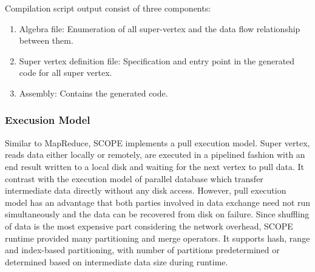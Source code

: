 \documentclass[runningheads,a4paper]{llncs}
\begin{document}
{Compilation script output consist of three components:
\begin{enumerate}
	\item Algebra file: Enumeration of all super-vertex and the data flow relationship between them.
	\item Super vertex definition file: Specification and entry point in the generated code for all super vertex.
	\item Assembly: Contains the generated code.
\end{enumerate}

\subsubsection{Execusion Model}
Similar to MapReduce, SCOPE implements a pull execution model. Super vertex, reads data either locally or remotely, are executed in a pipelined fashion with an end result written to a local disk and waiting for the next vertex to pull data. It contrast with the execution model of parallel database which transfer intermediate data directly without any disk access. However, pull execution model has an advantage that both parties involved in data exchange need not run simultaneously and the data can be recovered from disk on failure. Since shuffling of data is the most expensive part considering the network overhead, SCOPE runtime provided many partitioning and merge operators.  It supports hash, range and index-based partitioning, with number of partitions predetermined or determined based on intermediate data size during runtime.


}
\end{document}

